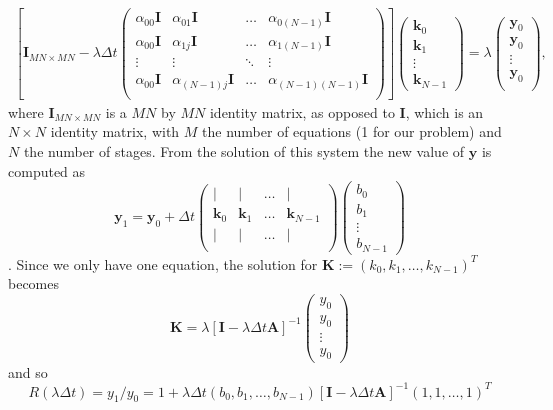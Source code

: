 \documentclass[10pt,a4paper]{article}
\newcommand{\bvec}[1]{\mathbf{#1}}
\begin{document}
\begin{align*}
  \left[ \bvec{I}_{MN\times MN} - \lambda \Delta t \begin{pmatrix}
    \alpha_{00}\bvec{I} &\alpha_{01}\bvec{I} &\hdots &\alpha_{0(N-1)}\bvec{I} \\
    \alpha_{00}\bvec{I} &\alpha_{1j}\bvec{I} &\hdots &\alpha_{1(N-1)}\bvec{I} \\
    \vdots & \vdots & \ddots & \vdots \\
    \alpha_{00}\bvec{I} &\alpha_{(N-1)j}\bvec{I} &\hdots &\alpha_{(N-1)(N-1)}\bvec{I} \\
  \end{pmatrix}\right] \begin{pmatrix} \bvec{k}_0 \\
    \bvec{k}_1 \\
    \vdots \\
    \bvec{k}_{N-1}
  \end{pmatrix} = \lambda
  \begin{pmatrix}
    \bvec{y}_0 \\
    \bvec{y}_0 \\
    \vdots \\
    \bvec{y}_0 \\
  \end{pmatrix},
\end{align*}
where $\bvec{I}_{MN\times MN}$ is a $MN$ by $MN$ identity matrix, as opposed to $\bvec{I}$, which is an $N\times N$ identity matrix, with $M$ the number of equations (1 for our problem) and $N$ the number of stages.
From the solution of this system the new value of $\bvec{y}$ is computed as
\begin{equation*}
  \bvec{y}_1 = \bvec{y}_0 + \Delta t
  \begin{pmatrix}
    \vert & \vert & \hdots & \vert \\
    \bvec{k}_0 & \bvec{k}_1 & \hdots & \bvec{k}_{N-1}\\
        \vert & \vert & \hdots & \vert \\
  \end{pmatrix}\begin{pmatrix}
    b_0 \\
    b_1 \\
    \vdots \\
    b_{N-1}
  \end{pmatrix}
\end{equation*}.
Since we only have one equation, the solution for $\bvec{K} := \left(k_0, k_1, \hdots, k_{N-1}\right)^T$ becomes
\begin{equation*}
  \bvec{K} = \lambda \left[ \bvec{I} - \lambda \Delta t \bvec{A}  \right]^{-1}
  \begin{pmatrix}
    y_0 \\
    y_0 \\
    \vdots \\
    y_0
  \end{pmatrix}
\end{equation*}
and so
\begin{equation*}
  R(\lambda \Delta t) = y_1/y_0 = 1 + \lambda \Delta t \left(b_0, b_1, \hdots, b_{N-1}\right)\left[\bvec{I} - \lambda \Delta t \bvec{A}\right]^{-1}\left(1, 1, \hdots, 1\right)^T
\end{equation*}
\end{document}
